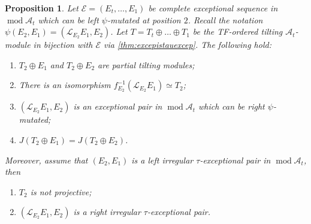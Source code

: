 \documentclass[10pt,twoside, a4paper,reqno]{amsart}
\DeclareMathOperator{\mods}{mod}
\newcommand{\A}{\mathscr{A}}
\newcommand{\Ecal}{\mathcal{E}}
\newcommand{\Lcal}{\mathcal{L}}
\newtheorem{proposition}[theorem]{Proposition}
\theoremstyle{definition}
\begin{document}
\begin{proposition}\label{prop:leftirregularprops}
    Let $\Ecal= (E_t, \dots, E_1)$ be complete exceptional sequence in $\mods \A_t$ which can be left $\psi$-mutated at position $2$. Recall the notation $\psi(E_2,E_1) = (\Lcal_{E_2} E_1, E_2)$. Let $T = T_t \oplus \dots \oplus T_1$ be the TF-ordered tilting $\A_t$-module in bijection with $\Ecal$ via \cref{thm:excepistauexcep}. The following hold:
    \begin{enumerate}
        \item $T_2 \oplus E_1$ and $T_2 \oplus E_2$ are partial tilting modules;
        \item  There is an isomorphism $f_{E_2}^{-1}(\Lcal_{E_2} E_1) \simeq T_2$;
        \item $(\Lcal_{E_2} E_1, E_2)$ is an exceptional pair in $\mods \A_t$ which can be right $\psi$-mutated;
        \item $J(T_2 \oplus E_1) = J(T_2 \oplus E_2)$.
    \end{enumerate}
    Moreover, assume that $(E_2, E_1)$ is a left irregular $\tau$-exceptional pair in $\mods \A_t$, then 
    \begin{enumerate}
    	\item[(5)] $T_2$ is not projective;
        \item[(6)] $(\Lcal_{E_2} E_1, E_2)$ is a right irregular $\tau$-exceptional pair.
    \end{enumerate}
\end{proposition}
\end{document}
